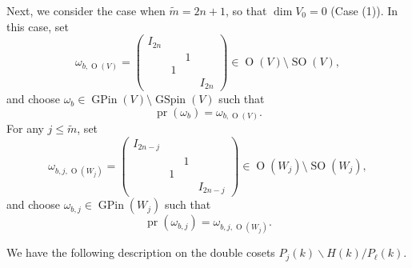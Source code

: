 \documentclass[12pt]{amsart}
\theoremstyle{remark}
\newcommand{\pr}{\operatorname{pr}}
\DeclareMathOperator{\SO}{SO}
\DeclareMathOperator{\GSpin}{GSpin}
\DeclareMathOperator{\GPin}{GPin}
\DeclareMathOperator{\Orth}{O}
\begin{document}
Next, we consider the case when $\widetilde{m}=2n+1$, so that $\dim V_0=0$ (Case (1)). In this case, set
\begin{equation*}
\omega_{b,\Orth(V)}= \left(\begin{smallmatrix}I_{2n} & & &\\&&1&\\&1&&\\&&&I_{2n}  \end{smallmatrix} \right)\in \Orth(V)\setminus \SO(V),
\end{equation*}
and choose $\omega_b\in \GPin(V)\setminus \GSpin(V)$ such that 
\begin{equation}
\pr(\omega_b)=\omega_{b,\Orth(V)}.	
\end{equation}
For any $j\le \widetilde{m}$, set 
\begin{equation*}
\omega_{b,j,\Orth(W_j)}=	 \left(\begin{smallmatrix}I_{2n-j} & & &\\&&1&\\&1&&\\&&&I_{2n-j}  \end{smallmatrix} \right)\in \Orth(W_j)\setminus \SO(W_j),
\end{equation*}
and choose $\omega_{b,j}\in \GPin(W_j)$ such that 
\begin{equation}
\label{eq-omega_b,j-2}
\pr(\omega_{b,j})=\omega_{b,j,\Orth(W_j)}.	
\end{equation}

 
We have the following description on the double cosets $P_j(k) \backslash H(k)/P_{\ell}(k)$. 
\end{document}

